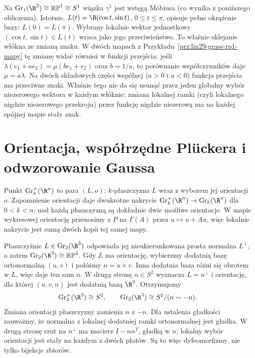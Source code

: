 \begin{przyklad}
Na $\operatorname{Gr}_1(\R^2)\cong\mathbb{RP}^1\cong S^1$
wiązka $\gamma^1$ jest wstęgą Möbiusa (co wynika z poniższego obliczenia). Istotnie,
$L(t)=\R(\cos t,\sin t)$, $0\leq t\leq\pi$,
opisuje pełne okrążenie bazy: $L(0)=L(\pi)$.
Wybrany lokalnie wektor jednostkowy
$(\cos t,\sin t)\in L(t)$ wraca jako jego
przeciwieństwo. To właśnie sklejanie włókna
ze zmianą znaku.
W dwóch mapach z Przykładu~\ref{prz:lin29-grass-rp1-mapy} tę zmianę
widać również w funkcji przejścia: jeśli
$\lambda(e_1+ae_2)=\mu(be_1+e_2)$ oraz $b=1/a$,
to porównanie współczynników daje $\mu=a\lambda$.
Na dwóch składowych części wspólnej ($a>0$ i $a<0$)
funkcja przejścia ma przeciwne znaki. Właśnie tego
nie da się usunąć przez jeden globalny wybór
niezerowego wektora w każdym włóknie: zmiana
lokalnej ramki (czyli lokalnego nigdzie niezerowego przekroju)
przez funkcję nigdzie niezerową
ma na każdej spójnej mapie stały znak.
\end{przyklad}

\section{Orientacja, współrzędne Plückera i odwzorowanie Gaussa}
\label{sec:lin29-grass-plucker}

\begin{definicja}
Punkt $\operatorname{Gr}^+_k(\R^n)$ to para $(L,o)$:
$k$-płaszczyzna $L$ wraz z wyborem jej orientacji $o$.
Zapomnienie orientacji daje dwukrotne nakrycie
$\operatorname{Gr}^+_k(\R^n)\to\operatorname{Gr}_k(\R^n)$
dla $0<k<n$: nad każdą płaszczyzną są dokładnie
dwie możliwe orientacje. W mapie wykresowej
orientację przenosimy z $P$ na $\Gamma(A)$ przez
$u\mapsto u+Au$, więc lokalnie nakrycie jest
sumą dwóch kopii tej samej mapy.
\end{definicja}

\begin{przyklad}[Płaszczyzny w $\R^3$]
Płaszczyźnie $L\in\operatorname{Gr}_2(\R^3)$
odpowiada jej nieukierunkowana prosta normalna
$L^\perp$, a zatem
$\operatorname{Gr}_2(\R^3)\cong\mathbb{RP}^2$.
Gdy $L$ ma orientację, wybierzmy dodatnią bazę
ortonormalną $(u,v)$ i połóżmy $n=u\times v$.
Inna dodatnia baza różni się obrotem w $L$,
więc daje ten sam $n$. W drugą stronę $n\in S^2$
wyznacza $L=n^\perp$ i orientację, dla której
$(u,v,n)$ jest dodatnią bazą $\R^3$. Otrzymujemy
\[
 \operatorname{Gr}^+_2(\R^3)\cong S^2,\qquad
 \operatorname{Gr}_2(\R^3)\cong S^2/(n\sim -n).
\]
Zmiana orientacji płaszczyzny zamienia $n$ z $-n$.
Dla ustalenia gładkości zauważmy, że normalna z lokalnej dodatniej
ramki ortonormalnej jest gładka. W drugą stronę rzut
na $n^\perp$ ma macierz $I-nn^T$, gładką w $n$;
lokalny wybór orientacji jest stały na każdym z dwóch płatów.
Są to więc dyfeomorfizmy, nie tylko bijekcje zbiorów.
\end{przyklad}

